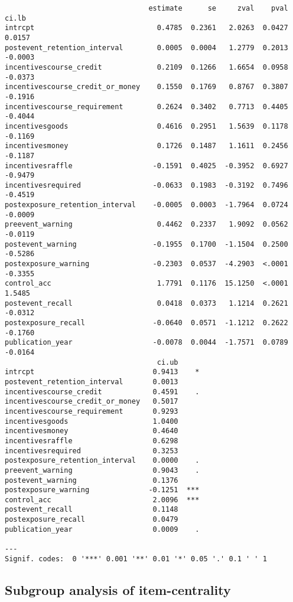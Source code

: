 \documentclass[
  letterpaper,
  DIV=11,
  numbers=noendperiod]{scrartcl}
\begin{document}
\begin{verbatim}
                                  estimate      se     zval    pval    ci.lb 
intrcpt                             0.4785  0.2361   2.0263  0.0427   0.0157 
postevent_retention_interval        0.0005  0.0004   1.2779  0.2013  -0.0003 
incentivescourse_credit             0.2109  0.1266   1.6654  0.0958  -0.0373 
incentivescourse_credit_or_money    0.1550  0.1769   0.8767  0.3807  -0.1916 
incentivescourse_requirement        0.2624  0.3402   0.7713  0.4405  -0.4044 
incentivesgoods                     0.4616  0.2951   1.5639  0.1178  -0.1169 
incentivesmoney                     0.1726  0.1487   1.1611  0.2456  -0.1187 
incentivesraffle                   -0.1591  0.4025  -0.3952  0.6927  -0.9479 
incentivesrequired                 -0.0633  0.1983  -0.3192  0.7496  -0.4519 
postexposure_retention_interval    -0.0005  0.0003  -1.7964  0.0724  -0.0009 
preevent_warning                    0.4462  0.2337   1.9092  0.0562  -0.0119 
postevent_warning                  -0.1955  0.1700  -1.1504  0.2500  -0.5286 
postexposure_warning               -0.2303  0.0537  -4.2903  <.0001  -0.3355 
control_acc                         1.7791  0.1176  15.1250  <.0001   1.5485 
postevent_recall                    0.0418  0.0373   1.1214  0.2621  -0.0312 
postexposure_recall                -0.0640  0.0571  -1.1212  0.2622  -0.1760 
publication_year                   -0.0078  0.0044  -1.7571  0.0789  -0.0164 
                                    ci.ub      
intrcpt                            0.9413    * 
postevent_retention_interval       0.0013      
incentivescourse_credit            0.4591    . 
incentivescourse_credit_or_money   0.5017      
incentivescourse_requirement       0.9293      
incentivesgoods                    1.0400      
incentivesmoney                    0.4640      
incentivesraffle                   0.6298      
incentivesrequired                 0.3253      
postexposure_retention_interval    0.0000    . 
preevent_warning                   0.9043    . 
postevent_warning                  0.1376      
postexposure_warning              -0.1251  *** 
control_acc                        2.0096  *** 
postevent_recall                   0.1148      
postexposure_recall                0.0479      
publication_year                   0.0009    . 

---
Signif. codes:  0 '***' 0.001 '**' 0.01 '*' 0.05 '.' 0.1 ' ' 1
\end{verbatim}

\hypertarget{subgroup-analysis-of-item-centrality}{%
\subsection{Subgroup analysis of
item-centrality}\label{subgroup-analysis-of-item-centrality}}
\end{document}
